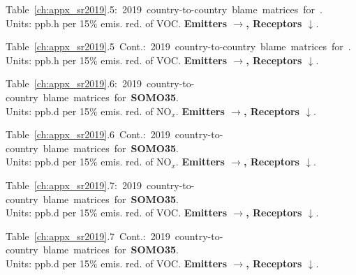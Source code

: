 \footnotesize{\mbox{Table \ref{ch:appx_sr2019}.5: 2019 country-to-country blame matrices for \textbf{\aotucf}.}\\ Units: ppb.h per 15\% emis. red. of VOC. \textbf{Emitters $\rightarrow$, Receptors $\downarrow$}. }\\[\baselineskip]\enlargethispage{\myenlarge} \hspace{-0.5cm} 
\centerline{}\clearpage
\footnotesize{\mbox{Table \ref{ch:appx_sr2019}.5 Cont.: 2019 country-to-country blame matrices for \textbf{\aotucf}.}\\ Units: ppb.h per 15\% emis. red. of VOC. \textbf{Emitters $\rightarrow$, Receptors $\downarrow$}. }\\[\baselineskip]\enlargethispage{\myenlarge} \hspace{-0.5cm} 
\centerline{}\clearpage

\footnotesize{\mbox{Table \ref{ch:appx_sr2019}.6: 2019 country-to-country blame matrices for \textbf{SOMO35}.}\\ Units: ppb.d per 15\% emis. red. of NO$_x$. \textbf{Emitters $\rightarrow$, Receptors $\downarrow$}. }\\[\baselineskip]\enlargethispage{\myenlarge} \hspace{-0.5cm} 
\centerline{}\clearpage
\footnotesize{\mbox{Table \ref{ch:appx_sr2019}.6 Cont.: 2019 country-to-country blame matrices for \textbf{SOMO35}.}\\ Units: ppb.d per 15\% emis. red. of NO$_x$. \textbf{Emitters $\rightarrow$, Receptors $\downarrow$}. }\\[\baselineskip]\enlargethispage{\myenlarge} \hspace{-0.5cm} 
\centerline{}\clearpage

\footnotesize{\mbox{Table \ref{ch:appx_sr2019}.7: 2019 country-to-country blame matrices for \textbf{SOMO35}.}\\ Units: ppb.d per 15\% emis. red. of VOC. \textbf{Emitters $\rightarrow$, Receptors $\downarrow$}. }\\[\baselineskip]\enlargethispage{\myenlarge} \hspace{-0.5cm} 
\centerline{}\clearpage
\footnotesize{\mbox{Table \ref{ch:appx_sr2019}.7 Cont.: 2019 country-to-country blame matrices for \textbf{SOMO35}.}\\ Units: ppb.d per 15\% emis. red. of VOC. \textbf{Emitters $\rightarrow$, Receptors $\downarrow$}. }\\[\baselineskip]\enlargethispage{\myenlarge} \hspace{-0.5cm} 
\centerline{}\clearpage

